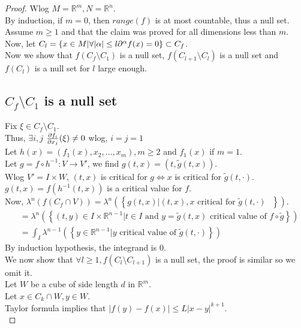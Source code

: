 \documentclass[../main.tex]{subfiles}
\begin{document}
\begin{proof}
Wlog $M= \mathbb{R}^{m}, N = \mathbb{R}^{n}$.\\
By induction, if $m=0$, then $range( f) $ is at most countable, thus a null set.\\
Assume $m \geq 1$ and that the claim was proved for all dimensions less than $m$.\\
Now, let $ C_l = \left\{ x\in M |\forall |\alpha| \leq  l \partial^{\alpha}f( x) =0 \right\} \subset C_f$.\\
Now we show that $f( C_f\setminus C_1) $ is a null set, $f( C_{l+1} \setminus C_l) $ is a null set and $f( C_l) $ is a null set for $l$ large enough.\\
\subsection*{$C_f\setminus C_1$ is a null set}
Fix $\xi\in C_f \setminus C_1$.\\
Thus, $\exists i,j$  $ \frac{\partial f_i}{\partial x_j}( \xi) \neq 0$ wlog, $i=j =1$ \\
Let $h( x) = ( f_1( x) , x_2,\ldots,x_m), m \geq 2$ and $f_1( x)$ if $m=1$.\\
Let $g= f\circ h^{-1}: V\to V'$, we find $g( t,x) = ( t, \tilde g ( t,x) ) $.\\
Wlog $V' = I \times W$, $( t,x) $ is critical for $g\iff x$ is critical for $\tilde g ( t,\cdot) $.\\
$g( t,x) = f( h^{-1}( t,x) ) $ is a critical value for $f$.\\
Now, $\lambda^{n}( f( C_f \cap V) ) = \lambda^{n}(  \left\{ g( t,x) | ( t,x), x \text{ critical for $\tilde g ( t,\cdot) $  }  \right\} )$.
\begin{align*}
&= \lambda^{n}(  \left\{ ( t,y) \in I\times \mathbb{R}^{n-1}| t \in I \text{ and } y = \tilde g ( t,x) \text{ critical value of } f\circ \tilde g  \right\} ) \\
&= \int_I \lambda^{n-1}( \left\{ y \in \mathbb{R}^{n-1}| y \text{ critical value of } \tilde g ( t,\cdot)  \right\} ) 
\end{align*}
By induction hypothesis, the integrand is 0.\\
We now show that $\forall l \geq 1, f( C_l \setminus C_{l+1} ) $ is a null set, the proof is similar so we omit it.\\
Let $W$ be a cube of side length $d$ in $ \mathbb{R}^{m}$.\\
Let $x\in C_k \cap W, y \in W$.\\
Taylor formula implies that $|f( y) - f( x) | \leq L |x-y|^{k+1}$.\\

\end{proof}
\end{document}
